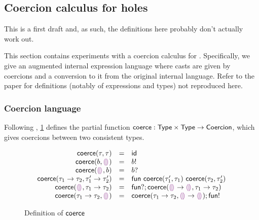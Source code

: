 \documentclass[index.tex]{subfiles}
\begin{document}
\newcommand{\IEHoleNum}{\ensuremath{\SyHoleNum}}
\newcommand{\IEHoleEnv}{\ensuremath{\SyHoleEnv}}

\newcommand{\IEMVO}{\ensuremath{d}}
\newcommand{\IECastO}[3]{\ensuremath{\IECast{#1}{#2 \Rightarrow #3}}}

\subsection{Coercion calculus for holes}
\label{sec:coercion}
\begin{warning}
  This is a first draft and, as such, the definitions here probably don't actually work out.
\end{warning}
%
This section contains experiments with a coercion calculus for \Hazelnut{}. Specifically, we give an
augmented internal expression language where casts are given by coercions and a conversion to it
from the original internal language. Refer to the \HazelnutLive{} paper \cite{omar2019} for
definitions (notably of expressions and types) not reproduced here.

\subsubsection{Coercion language}
\label{sec:coercion-language}
Following \textcite{herman2010}, \cref{fig:coercion-coerce} defines the partial function $\textsf{coerce} :
\textsf{Type} \times \textsf{Type} \to \textsf{Coercion}$, which gives coercions between two consistent types.

\begin{figure}[htb!]
  \newcommand{\coerceRowIs}[3]{\ensuremath{\coerce(#1, #2) &=& #3}}
  \[\begin{array}{rcl}
    \coerceRowIs{\TMV}{\TMV}{\CId} \\
    \coerceRowIs{\TBase}{\THole}{\CEmb{\DTBase}} \\
    \coerceRowIs{\THole}{\TBase}{\CProj{\DTBase}} \\
    \coerceRowIs{\TArrow{\TMV_1}{\TMV_2}}{\TArrow{\TMV_1'}{\TMV_2'}}{\CFun{\coerce(\TMV_1', \TMV_1)}{\coerce(\TMV_2, \TMV_2')}} \\
    \coerceRowIs{\THole}{\TArrow{\TMV_1}{\TMV_2}}{\CCompose{\CProj{\DTFun}}{\coerce(\TArrow{\THole}{\THole}, \TArrow{\TMV_1}{\TMV_2})}} \\
    \coerceRowIs{\TArrow{\TMV_1}{\TMV_2}}{\THole}{\CCompose{\coerce(\TArrow{\TMV_1}{\TMV_2}, \TArrow{\THole}{\THole})}{\CEmb{\DTFun}}}
  \end{array}\]
  \caption{Definition of $\textsf{coerce}$}
  \label{fig:coercion-coerce}
\end{figure}
\end{document}
